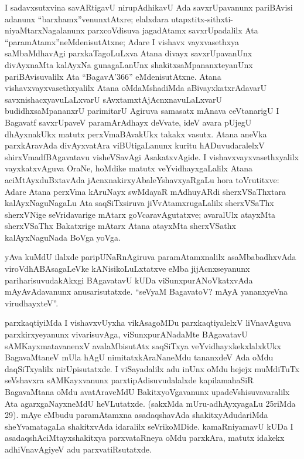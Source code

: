 I sadavxsutxvina savARtigavU nirupAdhikavU Ada savxrUpavanunx pariBAvisi adanunx ``barxhamx''venunxtAtxre; elalxdara utapxtitx-sithxti-niyaMtarxNagalanunx parxcoVdisuva jagadAtamx savxrUpadalilx Ata ``paramAtamx''neMdenisutAtxne; Adare I vishavx vayxvasethxya saMbaMdhavAgi parxkaTagoLuLxva Atana divayx savxrUpavanUnx divAyxnaMta kalAyxNa gunagaLanUnx shakitxsaMpananxteyanUnx pariBAvisuvalilx Ata ``BagavA\char'366'' eMdenisutAtxne. Atana vishavxvayxvasethxyalilx Atana oMdaMshadiMda aBivayxkatxrAdavarU savxnishacxyavuLaLxvarU sAvxtamxtAjAcnxnavuLaLxvarU budidhxsaMpananxrU parimitarU Agiruva samasatx mAnava ceVtanarigU I Bagavatf savxrUpaveV paramArAdhayx deVvate, ideV avara pUjegU dhAyxnakUkx matutx perxVmaBAvakUkx takakx vasutx. Atana aneVka parxkAravAda divAyxvatAra viBUtigaLanunx kuritu hADuvudaralelxV shirxVmadfBAgavatavu visheVSavAgi AsakatxvAgide. I vishavxvayxvasethxyalilx vayxkatxvAguva OraNe, hoMdike matutx veYvidhayxgaLalilx Atana aciMtAyxduBxtavAda jAcnxnakirxyAbaleYshavxyaRgaLu hora toVrutitxve: Adare Atana perxVma kAruNayx swMdayaR mAdhuyARdi sherxVSaThxtara kalAyxNaguNagaLu Ata saqSiTxsiruva jiVvAtamxrugaLalilx sherxVSaThx sherxVNige seVridavarige mAtarx goVcaravAgutatxve; avaralUlx atayxMta sherxVSaThx Bakatxrige mAtarx Atana atayxMta sherxVSathx kalAyxNaguNada BoVga yoVga.

yAva kuMdU ilalxde paripUNaRnAgiruva paramAtamxnalilx asaMbabadhxvAda viroVdhABAsagaLeVke kANisikoLuLxtatxve eMba jijAcnxseyanunx pariharisuvudakAkxgi BAgavatavU kUDa viSunxpurANoVkatxvAda mAyAvAdavanunx anusarisutatxde. ``seVyaM BagavatoV? mAyA yananxyeVna virudhayxteV''.

parxkaqtiyiMda I vishavxvUyxha vikAsagoMDu parxkaqtiyalelxV liVnavAguva parxkirxye\break\-yanunx vivarisuvAga, viSunxpurANadaMte BAgavatavU sAMKayxmatavanenxV avalaMbi\-sutAtx saqSiTxya veYvidhayxkekxlalxkUkx BagavaMtaneV mUla hAgU nimitatxkAraNaneMdu tananxdeV Ada oMdu daqSiTxyalilx nirUpisutatxde. I viSayadalilx adu inUnx oMdu hejejx muMdiTuTx seVshavxra sAMKayxvanunx parxtipAdisuvudalalxde kapilamahaSiR BagavaMtana oMdu avatAraveMdU BakitxyoVgavanunx upadeVshisuvavaralilx Ata agarxgaNayxneMdU heVLutatxde. (sakxMda mUru-adhAyxyagaLu 25riMda 29). mAye eMbudu paramAtamxna asadaqshavAda shakitxyAdudariMda sheYvamatagaLa shakitxvAda idaralilx seVrikoMDide. kamaRniyamavU kUDa I asadaqshAciMtayxshakitxya parxvataRneya oMdu parxkAra, matutx idakekx adhiVnavAgiyeV adu parxvatiRsutatxde.

